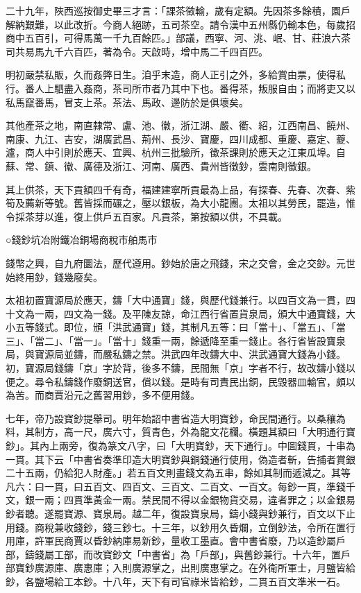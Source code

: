二十九年，陜西巡按御史畢三才言：「課茶徵輸，歲有定額。先因茶多餘積，園戶解納艱難，以此改折。今商人絕跡，五司茶空。請令漢中五州縣仍輸本色，每歲招商中五百引，可得馬萬一千九百餘匹。」部議，西寧、河、洮、岷、甘、莊浪六茶司共易馬九千六百匹，著為令。天啟時，增中馬二千四百匹。

明初嚴禁私販，久而姦弊日生。洎乎末造，商人正引之外，多給賞由票，使得私行。番人上駟盡入姦商，茶司所市者乃其中下也。番得茶，叛服自由；而將吏又以私馬竄番馬，冒支上茶。茶法、馬政、邊防於是俱壞矣。

其他產茶之地，南直隸常、盧、池、徽，浙江湖、嚴、衢、紹，江西南昌、饒州、南康、九江、吉安，湖廣武昌、荊州、長沙、寶慶，四川成都、重慶、嘉定、夔、瀘，商人中引則於應天、宜興、杭州三批驗所，徵茶課則於應天之江東瓜埠。自蘇、常、鎮、徽、廣德及浙江、河南、廣西、貴州皆徵鈔，雲南則徵銀。

其上供茶，天下貢額四千有奇，福建建寧所貢最為上品，有探春、先春、次春、紫筍及薦新等號。舊皆採而碾之，壓以銀板，為大小龍團。太祖以其勞民，罷造，惟令採茶芽以進，復上供戶五百家。凡貢茶，第按額以供，不具載。

○錢鈔坑冶附鐵冶銅場商稅市舶馬市

錢幣之興，自九府圜法，歷代遵用。鈔始於唐之飛錢，宋之交會，金之交鈔。元世始終用鈔，錢幾廢矣。

太祖初置寶源局於應天，鑄「大中通寶」錢，與歷代錢兼行。以四百文為一貫，四十文為一兩，四文為一錢。及平陳友諒，命江西行省置貨泉局，頒大中通寶錢，大小五等錢式。即位，頒「洪武通寶」錢，其制凡五等：曰「當十」、「當五」、「當三」、「當二」、「當一」。「當十」錢重一兩，餘遞降至重一錢止。各行省皆設寶泉局，與寶源局並鑄，而嚴私鑄之禁。洪武四年改鑄大中、洪武通寶大錢為小錢。初，寶源局錢鑄「京」字於背，後多不鑄，民間無「京」字者不行，故改鑄小錢以便之。尋令私鑄錢作廢銅送官，償以錢。是時有司責民出銅，民毀器皿輸官，頗以為苦。而商賈沿元之舊習用鈔，多不便用錢。

七年，帝乃設寶鈔提舉司。明年始詔中書省造大明寶鈔，命民間通行。以桑穰為料，其制方，高一尺，廣六寸，質青色，外為龍文花欄。橫題其額曰「大明通行寶鈔」。其內上兩旁，復為篆文八字，曰「大明寶鈔，天下通行」。中圖錢貫，十串為一貫。其下云「中書省奏準印造大明寶鈔與銅錢通行使用，偽造者斬，告捕者賞銀二十五兩，仍給犯人財產。」若五百文則畫錢文為五串，餘如其制而遞減之。其等凡六：曰一貫，曰五百文、四百文、三百文、二百文、一百文。每鈔一貫，準錢千文，銀一兩；四貫準黃金一兩。禁民間不得以金銀物貨交易，違者罪之；以金銀易鈔者聽。遂罷寶源、寶泉局。越二年，復設寶泉局，鑄小錢與鈔兼行，百文以下止用錢。商稅兼收錢鈔，錢三鈔七。十三年，以鈔用久昏爛，立倒鈔法，令所在置行用庫，許軍民商賈以昏鈔納庫易新鈔，量收工墨直。會中書省廢，乃以造鈔屬戶部，鑄錢屬工部，而改寶鈔文「中書省」為「戶部」，與舊鈔兼行。十六年，置戶部寶鈔廣源庫、廣惠庫；入則廣源掌之，出則廣惠掌之。在外衛所軍士，月鹽皆給鈔，各鹽場給工本鈔。十八年，天下有司官祿米皆給鈔，二貫五百文準米一石。

